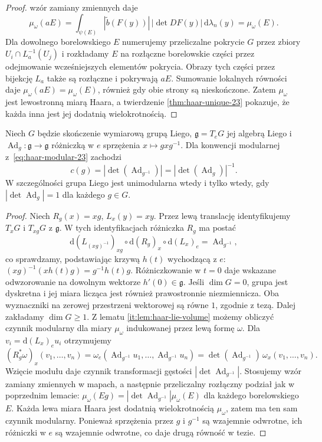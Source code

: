 \begin{proof}
wzór zamiany zmiennych daje
\[
 \mu_\omega(aE)
 =\int_{\psi(E)}|\widetilde b(F(y))|\,|\det DF(y)|
       \,\mathrm d\lambda_n(y)
 =\mu_\omega(E).
\]
Dla dowolnego borelowskiego $E$ numerujemy przeliczalne
pokrycie $G$ przez zbiory $U_i\cap L_a^{-1}(U_j)$
i rozkładamy $E$ na rozłączne borelowskie części
przez odejmowanie wcześniejszych elementów pokrycia.
Obrazy tych części przez bijekcję $L_a$ także są
rozłączne i pokrywają $aE$. Sumowanie lokalnych
równości daje $\mu_\omega(aE)=\mu_\omega(E)$,
również gdy obie strony są nieskończone.
Zatem $\mu_\omega$ jest lewostronną miarą Haara,
a twierdzenie \ref{thm:haar-unique-23} pokazuje,
że każda inna jest jej dodatnią wielokrotnością.
\end{proof}

\begin{wniosek}
\label{cor:haar-adjoint-23}
Niech $G$ będzie skończenie wymiarową grupą Liego,
$\mathfrak g=T_eG$ jej algebrą Liego i
$\operatorname{Ad}_g:\mathfrak g\to\mathfrak g$
różniczką w $e$ sprzężenia $x\mapsto gxg^{-1}$.
Dla konwencji modularnej z~\eqref{eq:haar-modular-23}
zachodzi
\[
 c(g)=|\det(\operatorname{Ad}_{g^{-1}})|
       =|\det(\operatorname{Ad}_{g})|^{-1}.
\]
W szczególności grupa Liego jest unimodularna wtedy
i tylko wtedy, gdy $|\det\operatorname{Ad}_g|=1$
dla każdego $g\in G$.
\end{wniosek}
\begin{proof}
Niech $R_g(x)=xg$, $L_x(y)=xy$.
Przez lewą translację identyfikujemy $T_xG$ i
$T_{xg}G$ z $\mathfrak g$. W tych identyfikacjach
różniczka $R_g$ ma postać
\[
 \mathrm d(L_{(xg)^{-1}})_{xg}\circ
 \mathrm d(R_g)_x\circ\mathrm d(L_x)_e
 =\operatorname{Ad}_{g^{-1}},
\]
co sprawdzamy, podstawiając krzywą $h(t)$ wychodzącą
z $e$: $(xg)^{-1}(xh(t)g)=g^{-1}h(t)g$.
Różniczkowanie w $t=0$ daje wskazane odwzorowanie
na dowolnym wektorze $h'(0)\in\mathfrak g$.
Jeśli $\dim G=0$, grupa jest dyskretna i jej miara
licząca jest również prawostronnie niezmiennicza.
Oba wyznaczniki na zerowej przestrzeni wektorowej
są równe $1$, zgodnie z tezą. Dalej zakładamy
$\dim G\ge1$.
Z lematu \ref{it:lem:haar-lie-volume} możemy
obliczyć czynnik modularny dla miary $\mu_\omega$
indukowanej przez lewą formę $\omega$.
Dla $v_i=\mathrm d(L_x)_e u_i$ otrzymujemy
\[
 (R_g^*\omega)_x(v_1,\ldots,v_n)
 =\omega_e(\operatorname{Ad}_{g^{-1}}u_1,\ldots,
            \operatorname{Ad}_{g^{-1}}u_n)
 =\det(\operatorname{Ad}_{g^{-1}})\,
     \omega_x(v_1,\ldots,v_n).
\]
Wzięcie modułu daje czynnik transformacji gęstości
$|\det\operatorname{Ad}_{g^{-1}}|$.
Stosujemy wzór zamiany zmiennych w mapach, a następnie
przeliczalny rozłączny podział jak w poprzednim lemacie:
$\mu_\omega(Eg)=|\det\operatorname{Ad}_{g^{-1}}|
\mu_\omega(E)$ dla każdego borelowskiego $E$.
Każda lewa miara Haara jest dodatnią wielokrotnością
$\mu_\omega$, zatem ma ten sam czynnik modularny.
Ponieważ sprzężenia przez $g$ i $g^{-1}$ są wzajemnie
odwrotne, ich różniczki w $e$ są wzajemnie odwrotne,
co daje drugą równość w tezie.
\end{proof}

